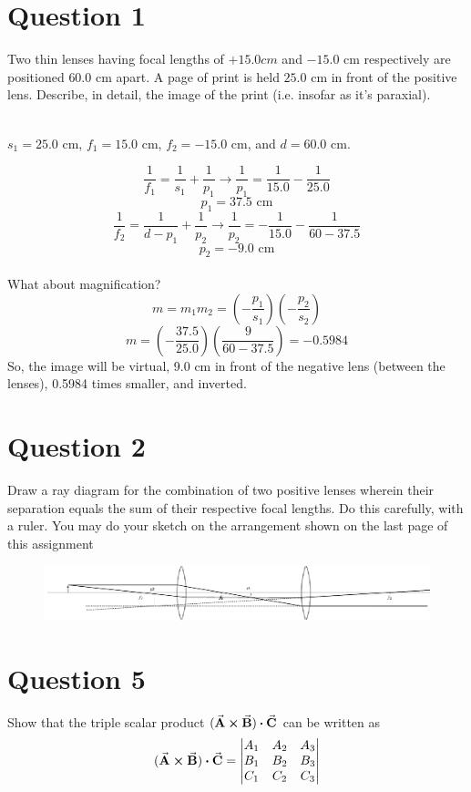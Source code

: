 \documentclass[a4paper]{article}
\begin{document}
\section*{Question 1}
Two thin lenses having focal lengths of $+15.0 cm$ and $-15.0$ cm respectively are positioned $60.0$ cm
apart. A page of print is held $25.0$ cm in front of the positive lens. Describe, in detail, the image of the
print (i.e. insofar as it’s paraxial). \\\\

\begin{center}
    $s_1 = 25.0$ cm, $f_1 = 15.0$ cm, $f_2 = -15.0$ cm, and $d = 60.0$ cm.
\end{center}
$$ \frac{1}{f_1} = \frac{1}{s_1} + \frac{1}{p_1} \rightarrow  \frac{1}{p_1} = \frac{1}{15.0} - \frac{1}{25.0}$$
$$ p_1 = 37.5 \textrm{ cm}$$
$$ \frac{1}{f_2} = \frac{1}{d - p_1} + \frac{1}{p_2} \rightarrow  \frac{1}{p_2} = -\frac{1}{15.0} - \frac{1}{60 - 37.5}$$
$$ p_2 = -9.0 \textrm{ cm}$$\\
What about magnification?
$$ m = m_1 m_2 = \left( - \frac{p_1}{s_1}\right) \left( - \frac{p_2}{s_2}\right)$$
$$ m = \left(-\frac{37.5}{25.0}\right) \left(\frac{9}{60-37.5}\right) = -0.5984$$
So, the image will be virtual, 9.0 cm in front of the negative lens (between the lenses), 0.5984 times smaller, and inverted.

\newpage
\section*{Question 2}
Draw a ray diagram for the combination of two positive lenses wherein their separation equals the
sum of their respective focal lengths. Do this carefully, with a ruler. You may do your sketch on the
arrangement shown on the last page of this assignment

\begin{figure}[htb!]
    \centering
    \includegraphics[angle=90]{hw2q2.pdf}
\end{figure}

\section*{Question 5}
Show that the triple scalar product $(\va{A} \cross \va{B}) \vdot \va{C}$ can be written as
$$ (\va{A} \cross \va{B}) \vdot \va{C} = 
    \begin{vmatrix}
    A_1 & A_2 & A_3 \\
    B_1 & B_2 & B_3 \\
    C_1 & C_2 & C_3 
    \end{vmatrix}  $$ \\\\
\end{document}
